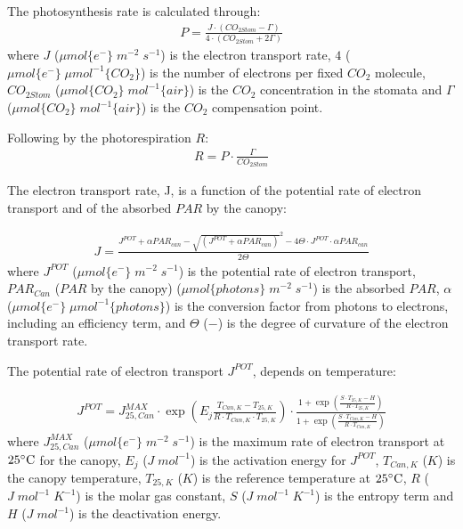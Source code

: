 \documentclass[a4paper]{article}
\begin{document}
The photosynthesis rate is calculated through:
\begin{align}
  P = \frac{J \cdot (CO_{2Stom} - \Gamma)}{4 \cdot (CO_{2Stom} + 2\Gamma)}
\end{align}
where \(J\) (\(\mu mol\{e^-\}\;m^{-2}\;s^{-1}\)) is the electron transport rate, \(4\) (\(\mu mol \{e^-\} \; \mu mol^{-1} \{CO_2\}\)) is the number of electrons per fixed \(CO_2\) molecule, \(CO_{2Stom}\) (\(\mu mol\{CO_2\}\;mol^{-1}\{air\}\)) is the \(CO_2\) concentration in the stomata and \(\Gamma\) (\(\mu mol \{CO_2\}\; mol^{-1} \{air\}\)) is the \(CO_2\) compensation point.

Following by the photorespiration \(R\):
\begin{align}
  R = P \cdot \frac{\Gamma}{CO_{2Stom}}
\end{align}

The electron transport rate, J, is a function of the potential rate of electron transport and of the absorbed \(PAR\) by the canopy:

\begin{align}
  J = \frac{J^{POT} + \alpha PAR_{can} - {\sqrt{(J^{POT} + \alpha PAR_{can})}^2 - 4\Theta\cdot J^{POT}\cdot \alpha PAR_{can}}}{2 \Theta}
\end{align}
where \(J^{POT}\) (\(\mu mol\{e^-\}\;m^{-2}\;s^{-1}\)) is the potential rate of electron transport, \(PAR_{Can}\) (\(PAR\) by the canopy) (\(\mu mol\{photons\}\;m^{-2}\;s^{-1}\)) is the absorbed \(PAR\), \(\alpha\) (\(\mu mol\{e^-\}\;\mu mol^{-1}\{photons\}\)) is the conversion factor from photons to electrons, including an efficiency term, and \(\Theta\) (\(-\)) is the degree of curvature of the electron transport rate.

The potential rate of electron transport \(J^{POT}\), depends on temperature:

\begin{align}
  J^{POT} = J^{MAX}_{25,Can} \cdot \exp \left(E_j\frac{T_{Can,K}-T_{25,K}}{R\cdot T_{Can,K}\cdot T_{25,K}}\right) \cdot \frac{1 + \exp \left(\frac{S\cdot T_{25,K}-H}{R\cdot T_{25,K}}\right)}{1 + \exp \left(\frac{S\cdot T_{Can,K}-H}{R\cdot T_{Can,K}}\right)}
\end{align}
where \(J^{MAX}_{25,Can}\) (\(\mu mol \{e^-\}\;m^{-2}\;s^{-1}\)) is the maximum rate of electron transport at \(25 \celsius\) for the canopy, \(E_j\) (\(J\;mol^{-1}\)) is the activation energy for \(J^{POT}\), \(T_{Can,K}\) (\(K\)) is the canopy temperature, \(T_{25,K}\) (\(K\)) is the reference temperature at \(25 \celsius\), \(R\) (\(J\;mol^{-1}\;K^{-1}\)) is the molar gas constant, \(S\) (\(J\;mol^{-1}\;K^{-1}\)) is the entropy term and \(H\) (\(J\;mol^{-1}\)) is the deactivation energy.
\end{document}
